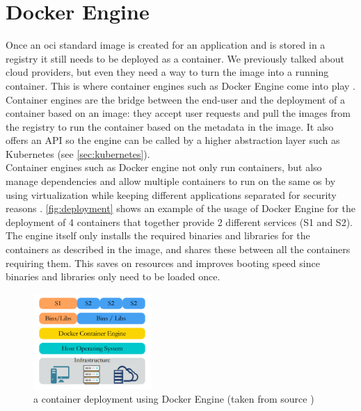 \section{Docker Engine} \label{sec:containerruntime}
Once an \acrshort{oci} standard image is created for an application and is stored in a registry it still needs to be deployed as a container. We previously talked about cloud providers, but even they need a way to turn the image into a running container. This is where container engines such as Docker Engine come into play \cite{dockerengine}. Container engines are the bridge between the end-user and the deployment of a container based on an image: they accept user requests and pull the images from the registry to run the container based on the metadata in the image. It also offers an API so the engine can be called by a higher abstraction layer such as Kubernetes (see \autoref{sec:kubernetes}). 
\\[10pt]

Container engines such as Docker engine not only run containers, but also manage dependencies and allow multiple containers to run on the same \acrshort{os} by using virtualization while keeping different applications separated for security reasons \cite{cnwiki}. \autoref{fig:deployment} shows an example of the usage of Docker Engine for the deployment of 4 containers that together provide 2 different services (S1 and S2). The engine itself only installs the required binaries and libraries for the containers as described in the image, and shares these between all the containers requiring them. This saves on resources and improves booting speed since binaries and libraries only need to be loaded once.
\\[10pt]

\begin{figure}[htbp]
  \centering
  \includegraphics[width=0.4\textwidth]{images/docker-containers.png} 
  \caption{a container deployment using Docker Engine (taken from source \cite{resman})}
  \label{fig:deployment}
\end{figure}

